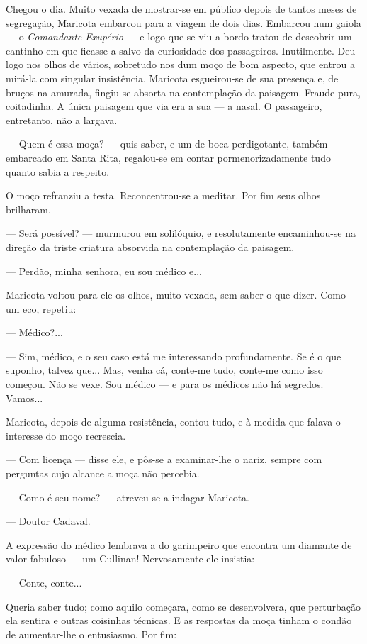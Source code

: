 Chegou o dia. Muito vexada de mostrar-se em público depois de tantos
meses de segregação, Maricota embarcou para a viagem de dois dias.
Embarcou num gaiola --- o \emph{Comandante Exupério} --- e logo que se
viu a bordo tratou de descobrir um cantinho em que ficasse a salvo da
curiosidade dos passageiros. Inutilmente. Deu logo nos olhos de vários,
sobretudo nos dum moço de bom aspecto, que entrou a mirá-la com singular
insistência. Maricota esgueirou-se de sua presença e, de bruços na
amurada, fingiu-se absorta na contemplação da paisagem. Fraude pura,
coitadinha. A única paisagem que via era a sua --- a nasal. O
passageiro, entretanto, não a largava.

--- Quem é essa moça? --- quis saber, e um de boca perdigotante, também
embarcado em Santa Rita, regalou-se em contar pormenorizadamente tudo
quanto sabia a respeito.

O moço refranziu a testa. Reconcentrou-se a meditar. Por fim seus olhos
brilharam.

--- Será possível? --- murmurou em solilóquio, e resolutamente
encaminhou-se na direção da triste criatura absorvida na contemplação da
paisagem.

--- Perdão, minha senhora, eu sou médico e...

Maricota voltou para ele os olhos, muito vexada, sem saber o que dizer.
Como um eco, repetiu:

--- Médico?...

--- Sim, médico, e o seu caso está me interessando profundamente. Se é o
que suponho, talvez que... Mas, venha cá, conte-me tudo, conte-me como
isso começou. Não se vexe. Sou médico --- e para os médicos não há
segredos. Vamos...

Maricota, depois de alguma resistência, contou tudo, e à medida que
falava o interesse do moço recrescia.

--- Com licença --- disse ele, e pôs-se a examinar-lhe o nariz, sempre
com perguntas cujo alcance a moça não percebia.

--- Como é seu nome? --- atreveu-se a indagar Maricota.

--- Doutor Cadaval.

A expressão do médico lembrava a do garimpeiro que encontra um diamante
de valor fabuloso --- um Cullinan! Nervosamente ele insistia:

--- Conte, conte...

Queria saber tudo; como aquilo começara, como se desenvolvera, que
perturbação ela sentira e outras coisinhas técnicas. E as respostas da
moça tinham o condão de aumentar-lhe o entusiasmo. Por fim:

